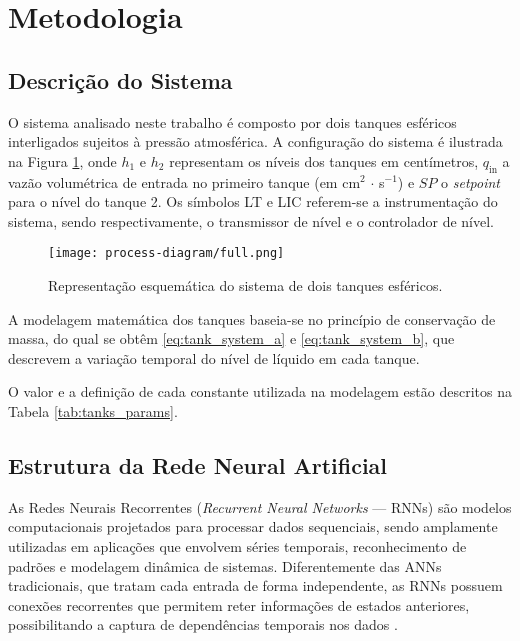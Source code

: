 \section{Metodologia}

\subsection{Descrição do Sistema}

O sistema analisado neste trabalho é composto por dois tanques esféricos interligados sujeitos à pressão atmosférica. A configuração do sistema é ilustrada na Figura \ref{fig:tank-system}, onde $h_1$ e $h_2$ representam os níveis dos tanques em centímetros, $q_{\mathrm{in}}$ a vazão volumétrica de entrada no primeiro tanque (em cm$^2$ $\cdot$ s$^{-1}$) e $SP$ o \textit{setpoint} para o nível do tanque 2. Os símbolos LT e LIC referem-se a instrumentação do sistema, sendo respectivamente, o transmissor de nível e o controlador de nível.

\begin{figure}[ht]
  \centering
  \texttt{[image: process-diagram/full.png]}
  \caption{Representação esquemática do sistema de dois tanques esféricos.}
  \label{fig:tank-system}
\end{figure}

A modelagem matemática dos tanques baseia-se no princípio de conservação de massa, do qual se obtêm \eqref{eq:tank_system_a} e \eqref{eq:tank_system_b}, que descrevem a variação temporal do nível de líquido em cada tanque.

%

O valor e a definição de cada constante utilizada na modelagem estão descritos na Tabela \ref{tab:tanks_params}.



\subsection{Estrutura da Rede Neural Artificial}

As Redes Neurais Recorrentes (\textit{Recurrent Neural Networks} — RNNs) são modelos computacionais projetados para processar dados sequenciais, sendo amplamente utilizadas em aplicações que envolvem séries temporais, reconhecimento de padrões e modelagem dinâmica de sistemas. Diferentemente das ANNs tradicionais, que tratam cada entrada de forma independente, as RNNs possuem conexões recorrentes que permitem reter informações de estados anteriores, possibilitando a captura de dependências temporais nos dados \citep{mienye_2024}.

